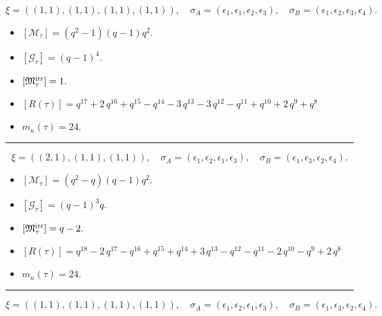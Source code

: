 \documentclass[10pt,a4paper]{amsart}
\begin{document}
$$\xi = ({(1, 1), (1, 1)}, {(1, 1)}, {(1, 1)}),\quad \sigma_A = ({{\epsilon_1}, {\epsilon_1}}, {{\epsilon_2}}, {{\epsilon_3}}),\quad \sigma_B = ({{\epsilon_1}, {\epsilon_2}}, {{\epsilon_3}}, {{\epsilon_4}}).$$

\begin{itemize}
 \item $[\mathcal{M}_{\tau}] = {\left(q^{2} - 1\right)} {\left(q - 1\right)} q^{2} .$

 \item $[\mathcal{G}_{\tau}] = {\left(q - 1\right)}^{4} .$

 \item $[{\frak M}_{\tau}^{\textrm{irr}}] = 1 .$

 \item $[R(\tau)] = q^{17} + 2 \, q^{16} + q^{15} - q^{14} - 3 \, q^{13} - 3 \, q^{12} - q^{11} + q^{10} + 2 \, q^{9} + q^{8} $

 \item $m_{\kappa}(\tau) = 24 .$

 \end{itemize}
\noindent\rule{8cm}{0.4pt}

$$\xi = ({(2, 1)}, {(1, 1)}, {(1, 1)}),\quad \sigma_A = ({{\epsilon_1, \epsilon_2}}, {{\epsilon_1}}, {{\epsilon_3}}),\quad \sigma_B = ({{\epsilon_1, \epsilon_3}}, {{\epsilon_2}}, {{\epsilon_4}}).$$

\begin{itemize}
 \item $[\mathcal{M}_{\tau}] = {\left(q^{2} - q\right)} {\left(q - 1\right)} q^{2} .$

 \item $[\mathcal{G}_{\tau}] = {\left(q - 1\right)}^{3} q .$

 \item $[{\frak M}_{\tau}^{\textrm{irr}}] = q - 2 .$

 \item $[R(\tau)] = q^{18} - 2 \, q^{17} - q^{16} + q^{15} + q^{14} + 3 \, q^{13} - q^{12} - q^{11} - 2 \, q^{10} - q^{9} + 2 \, q^{8} $

 \item $m_{\kappa}(\tau) = 24 .$

 \end{itemize}
\noindent\rule{8cm}{0.4pt}

$$\xi = ({(1, 1), (1, 1)}, {(1, 1)}, {(1, 1)}),\quad \sigma_A = ({{\epsilon_1}, {\epsilon_2}}, {{\epsilon_1}}, {{\epsilon_3}}),\quad \sigma_B = ({{\epsilon_1}, {\epsilon_3}}, {{\epsilon_2}}, {{\epsilon_4}}).$$
\end{document}

